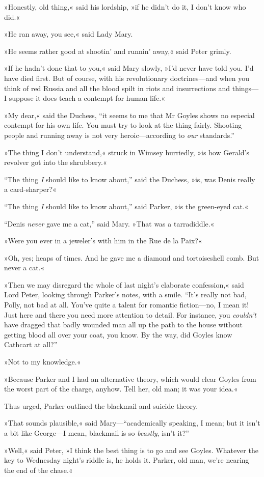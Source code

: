 »Honestly, old thing,« said his lordship, »if he didn't do it, I don't know who did.«

»He ran away, you see,« said Lady Mary.

»He seems rather good at shootin' and runnin' away,« said Peter grimly.

»If he hadn't done that to you,« said Mary slowly, »I'd never have told you. I'd have died first. But of course, with his revolutionary doctrines\allowbreak---\allowbreak and when you think of red Russia and all the blood spilt in riots and insurrections and things\allowbreak---\allowbreak I suppose it does teach a contempt for human life.«

»My dear,« said the Duchess, \enquote{it seems to me that Mr Goyles shows no especial contempt for his own life. You must try to look at the thing fairly. Shooting people and running away is not very heroic\allowbreak---\allowbreak according to \textit{our} standards.}

»The thing I don't understand,« struck in Wimsey hurriedly, »is how Gerald's revolver got into the shrubbery.«

\enquote{The thing \textit{I} should like to know about,} said the Duchess, »is, was Denis really a card-sharper?«

\enquote{The thing \textit{I} should like to know about,} said Parker, »is the green-eyed cat.«

\enquote{Denis \textit{never} gave me a cat,} said Mary. »That was a tarradiddle.«

»Were you ever in a jeweler's with him in the Rue de la Paix?«

»Oh, yes; heaps of times. And he gave me a diamond and tortoiseshell comb. But never a cat.«

»Then we may disregard the whole of last night's elaborate confession,« said Lord Peter, looking through Parker's notes, with a smile. \enquote{It's really not bad, Polly, not bad at all. You've quite a talent for romantic fiction\allowbreak---\allowbreak no, I mean it! Just here and there you need more attention to detail. For instance, you \textit{couldn't} have dragged that badly wounded man all up the path to the house without getting blood all over your coat, you know. By the way, did Goyles know Cathcart at all?}

»Not to my knowledge.«

»Because Parker and I had an alternative theory, which would clear Goyles from the worst part of the charge, anyhow. Tell her, old man; it was your idea.«

Thus urged, Parker outlined the blackmail and suicide theory.

»That sounds plausible,« said Mary---\enquote{academically speaking, I mean; but it isn't a bit like George\allowbreak---\allowbreak I mean, blackmail is so \textit{beastly}, isn't it?}

»Well,« said Peter, »I think the best thing is to go and see Goyles.  Whatever the key to Wednesday night's riddle is, he holds it. Parker, old man, we're nearing the end of the chase.«
